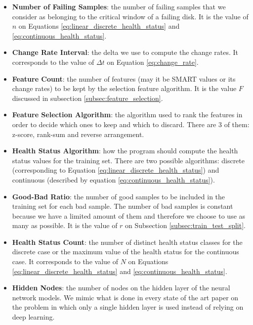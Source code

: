 \begin{itemize}
  \item \textbf{Number of Failing Samples}: the number of failing samples that we consider as belonging to the critical window of a failing disk. 
  It is the value of $n$ on Equations \ref{eq:linear_discrete_health_status} and \ref{eq:continuous_health_status}.

  \item \textbf{Change Rate Interval}: the delta we use to compute the change rates.
  It corresponds to the value of $\Delta t$ on Equation \ref{eq:change_rate}.

  \item \textbf{Feature Count}: the number of features (may it be SMART values or its change rates) to be kept by the selection feature algorithm.
  It is the value $F$ discussed in subsection \ref{subsec:feature_selection}.

  \item \textbf{Feature Selection Algorithm}: the algorithm used to rank the features in order to decide which ones to keep and which to discard.
  There are 3 of them: z-score, rank-sum and reverse arrangement.

  \item \textbf{Health Status Algorithm}: how the program should compute the health status values for the training set.
  There are two possible algorithms: discrete (corresponding to Equation \ref{eq:linear_discrete_health_status}) and continuous (described by equation \ref{eq:continuous_health_status}).
  
  \item \textbf{Good-Bad Ratio}: the number of good samples to be included in the training set for each bad sample.
  The number of bad samples is constant because we have a limited amount of them and therefore we choose to use as many as possible.
  It is the value of $r$ on Subsection \ref{subsec:train_test_split}.

  \item \textbf{Health Status Count}: the number of distinct health status classes for the discrete case or the maximum value of the health status for the continuous case.
  It corresponds to the value of $N$ on Equations \ref{eq:linear_discrete_health_status} and \ref{eq:continuous_health_status}.

  \item \textbf{Hidden Nodes}: the number of nodes on the hidden layer of the neural network models.
  We mimic what is done in every state of the art paper on the problem in which only a single hidden layer is used instead of relying on deep learning.


\end{itemize}
